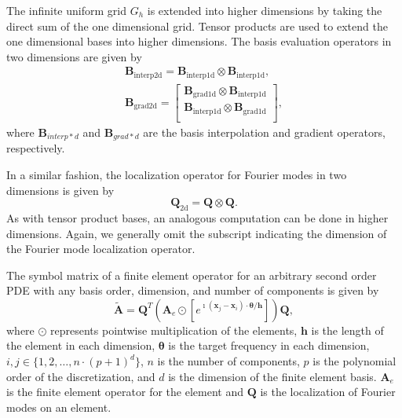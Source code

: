 \documentclass[review]{siamart190516}
\begin{document}
The infinite uniform grid $G_h$ is extended into higher dimensions by taking the direct sum of the one dimensional grid.
Tensor products are used to extend the one dimensional bases into higher dimensions.
The basis evaluation operators in two dimensions are given by
\begin{equation}
\begin{split}
\mathbf{B}_{\text{interp2d}} = \mathbf{B}_{\text{interp1d}} \otimes \mathbf{B}_{\text{interp1d}}, \\
\mathbf{B}_{\text{grad2d}} =
\begin{bmatrix}
    \mathbf{B}_{\text{grad1d}} \otimes \mathbf{B}_{\text{interp1d}} \\
    \mathbf{B}_{\text{interp1d}} \otimes \mathbf{B}_{\text{grad1d}} \\
\end{bmatrix},
\end{split}
\end{equation}
where $\mathbf{B}_{interp*d}$ and $\mathbf{B}_{grad*d}$ are the basis interpolation and gradient operators, respectively.

In a similar fashion, the localization operator for Fourier modes in two dimensions is given by
\begin{equation}
\mathbf{Q}_{\text{2d}} = \mathbf{Q} \otimes \mathbf{Q}.
\end{equation}
As with tensor product bases, an analogous computation can be done in higher dimensions.
Again, we generally omit the subscript indicating the dimension of the Fourier mode localization operator.

\begin{definition}\label{def:high_order_symbol}
The symbol matrix of a finite element operator for an arbitrary second order PDE with any basis order, dimension, and number of components is given by
\begin{equation}\label{symbolhighorder}
\tilde{\mathbf{A}} = \mathbf{Q}^T \left( \mathbf{A}_e \odot \left[ e^{\imath \left( \mathbf{x}_j - \mathbf{x}_i \right) \cdot \boldsymbol{\theta} / \mathbf{h}} \right] \right) \mathbf{Q},
\end{equation}
where $\odot$ represents pointwise multiplication of the elements, $\mathbf{h}$ is the length of the element in each dimension, $\boldsymbol{\theta}$ is the target frequency in each dimension, $i, j \in \lbrace 1, 2, \dots, n \cdot \left( p + 1 \right)^d \rbrace$, $n$ is the number of components, $p$ is the polynomial order of the discretization, and $d$ is the dimension of the finite element basis.
$\mathbf{A}_e$ is the finite element operator for the element and $\mathbf{Q}$ is the localization of Fourier modes on an element.
\end{definition}
\end{document}

